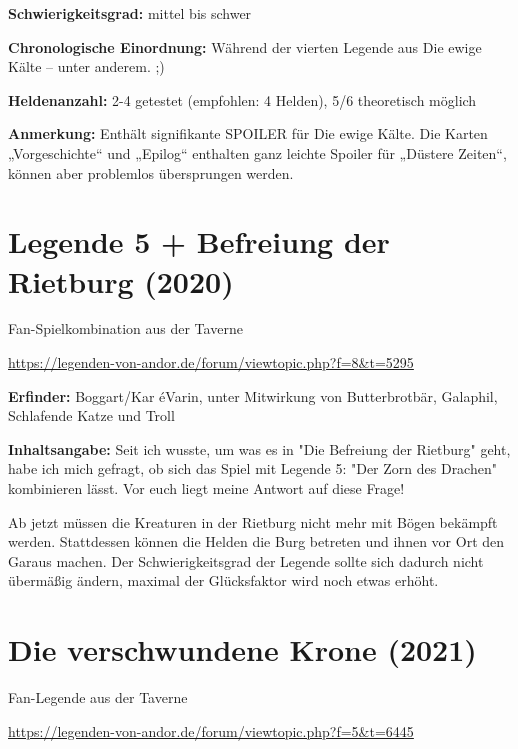 {\textbf{Schwierigkeitsgrad:} mittel bis schwer

\textbf{Chronologische Einordnung:} Während der vierten Legende aus Die ewige Kälte – unter anderem. ;)

\textbf{Heldenanzahl:} 2-4 getestet (empfohlen: 4 Helden), 5/6 theoretisch möglich

\textbf{Anmerkung:} Enthält signifikante SPOILER für Die ewige Kälte. Die Karten „Vorgeschichte“ und „Epilog“ enthalten ganz leichte Spoiler für „Düstere Zeiten“, können aber problemlos übersprungen werden.






\newpage
{}
\section{Legende 5 + Befreiung der Rietburg (2020)}

\begin{center}
    Fan-Spielkombination aus der Taverne

    \url{https://legenden-von-andor.de/forum/viewtopic.php?f=8&t=5295}
\end{center}


\textbf{Erfinder:} Boggart/Kar éVarin, unter Mitwirkung von Butterbrotbär, Galaphil, Schlafende Katze und Troll

\textbf{Inhaltsangabe:} Seit ich wusste, um was es in "Die Befreiung der Rietburg" geht, habe ich mich gefragt, ob sich das Spiel mit Legende 5: "Der Zorn des Drachen" kombinieren lässt. Vor euch liegt meine Antwort auf diese Frage!

Ab jetzt müssen die Kreaturen in der Rietburg nicht mehr mit Bögen bekämpft werden. Stattdessen können die Helden die Burg betreten und ihnen vor Ort den Garaus machen.
Der Schwierigkeitsgrad der Legende sollte sich dadurch nicht übermäßig ändern, maximal der Glücksfaktor wird noch etwas erhöht.



\newpage
{}
\section{Die verschwundene Krone (2021)}

\begin{center}
    Fan-Legende aus der Taverne

    \url{https://legenden-von-andor.de/forum/viewtopic.php?f=5&t=6445}
\end{center}

}
